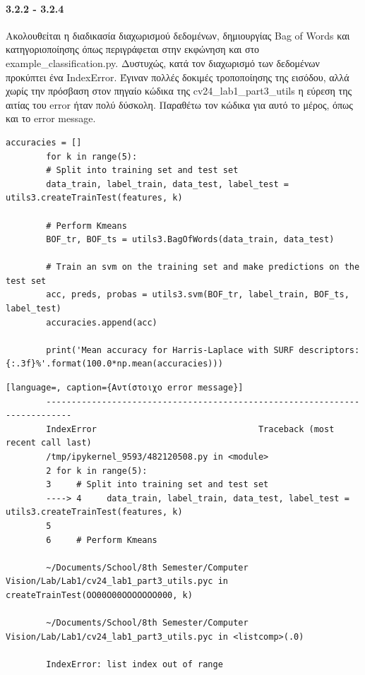 \documentclass[]{article}
\begin{document}
	\paragraph{3.2.2 - 3.2.4} Ακολουθείται η διαδικασία διαχωρισμού δεδομένων, δημιουργίας Bag of Words και κατηγοριοποίησης όπως περιγράφεται στην εκφώνηση και στο example\_classification.py. Δυστυχώς, κατά τον διαχωρισμό των δεδομένων προκύπτει ένα IndexError. Έγιναν πολλές δοκιμές τροποποίησης της εισόδου, αλλά χωρίς την πρόσβαση στον πηγαίο κώδικα της cv24\_lab1\_part3\_utils η εύρεση της αιτίας του error ήταν πολύ δύσκολη. Παραθέτω τον κώδικα για αυτό το μέρος, όπως και το error message.
	\begin{lstlisting}[caption={Υλοποίηση βημάτων 3.2.2 - 3.2.4}]
		accuracies = []
		for k in range(5):
		# Split into training set and test set
		data_train, label_train, data_test, label_test = utils3.createTrainTest(features, k)
		
		# Perform Kmeans
		BOF_tr, BOF_ts = utils3.BagOfWords(data_train, data_test)
		
		# Train an svm on the training set and make predictions on the test set
		acc, preds, probas = utils3.svm(BOF_tr, label_train, BOF_ts, label_test)
		accuracies.append(acc)
		
		print('Mean accuracy for Harris-Laplace with SURF descriptors: {:.3f}%'.format(100.0*np.mean(accuracies)))
	\end{lstlisting}
	\begin{lstlisting}[language=, caption={Αντίστοιχο error message}]
		---------------------------------------------------------------------------
		IndexError                                Traceback (most recent call last)
		/tmp/ipykernel_9593/482120508.py in <module>
		2 for k in range(5):
		3     # Split into training set and test set
		----> 4     data_train, label_train, data_test, label_test = utils3.createTrainTest(features, k)
		5 
		6     # Perform Kmeans
		
		~/Documents/School/8th Semester/Computer Vision/Lab/Lab1/cv24_lab1_part3_utils.pyc in createTrainTest(OO00O00OOOOOOO000, k)
		
		~/Documents/School/8th Semester/Computer Vision/Lab/Lab1/cv24_lab1_part3_utils.pyc in <listcomp>(.0)
		
		IndexError: list index out of range
	\end{lstlisting}
\end{document}
